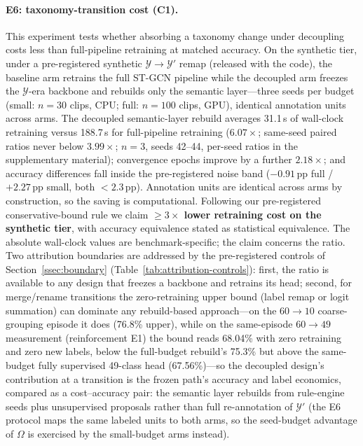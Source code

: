 \paragraph{E6: taxonomy-transition cost (C1).}
This experiment tests whether absorbing a taxonomy change under decoupling costs less than full-pipeline retraining at matched accuracy. On the synthetic tier, under a pre-registered synthetic $\mathcal{Y}\to\mathcal{Y}'$ remap (released with the code), the baseline arm retrains the full ST-GCN pipeline while the decoupled arm freezes the $\mathcal{Y}$-era backbone and rebuilds only the semantic layer---three seeds per budget (small: $n{=}30$ clips, CPU; full: $n{=}100$ clips, GPU), identical annotation units across arms. The decoupled semantic-layer rebuild averages 31.1\,s of wall-clock retraining versus 188.7\,s for full-pipeline retraining ($6.07\times$; same-seed paired ratios never below $3.99\times$; $n{=}3$, seeds 42--44, per-seed ratios in the supplementary material); convergence epochs improve by a further $2.18\times$; and accuracy differences fall inside the pre-registered noise band ($-0.91$\,pp full / $+2.27$\,pp small, both $<2.3$\,pp). Annotation units are identical across arms by construction, so the saving is computational. Following our pre-registered conservative-bound rule we claim \textbf{$\geq 3\times$ lower retraining cost on the synthetic tier}, with accuracy equivalence stated as statistical equivalence. The absolute wall-clock values are benchmark-specific; the claim concerns the ratio. Two attribution boundaries are addressed by the pre-registered controls of Section~\ref{ssec:boundary} (Table~\ref{tab:attribution-controls}): first, the ratio is available to any design that freezes a backbone and retrains its head; second, for merge/rename transitions the zero-retraining upper bound (label remap or logit summation) can dominate any rebuild-based approach---on the $60\to10$ coarse-grouping episode it does (76.8\% upper), while on the same-episode $60\to49$ measurement (reinforcement E1) the bound reads 68.04\% with zero retraining and zero new labels, below the full-budget rebuild's 75.3\% but above the same-budget fully supervised 49-class head (67.56\%)---so the decoupled design's contribution at a transition is the frozen path's accuracy and label economics, compared as a cost--accuracy pair: the semantic layer rebuilds from rule-engine seeds plus unsupervised proposals rather than full re-annotation of $\mathcal{Y}'$ (the E6 protocol maps the same labeled units to both arms, so the seed-budget advantage of $\Omega$ is exercised by the small-budget arms instead).


